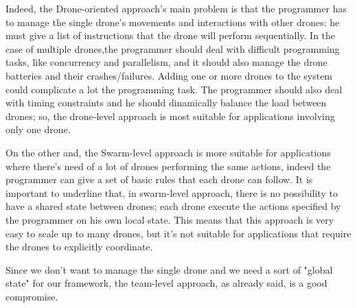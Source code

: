 Indeed, the Drone-oriented approach's main problem is that the programmer has to manage the single drone's movements and interactions with other drones: he must give a list of instructions that the drone will perform sequentially.
In the case of multiple drones,the programmer should deal with difficult programming tasks, like concurrency and parallelism, and it should also manage the drone batteries and their crashes/failures.
Adding one or more drones to the system could complicate a lot the programming task. The programmer should also deal with timing constraints and he should dinamically balance the load between drones; so, the drone-level approach is most suitable for applications involving only one drone.

On the other and, the Swarm-level approach is more suitable for applications where there’s need of a lot of drones performing the same actions, indeed the programmer can give a set of basic rules that each drone can follow. It is important to underline that, in swarm-level approach, there is no possibility to have a shared state between drones; each drone execute the actions specified by the programmer on his own local state. This means that this approach is very easy to scale up to many drones, but it’s not suitable for applications that require the drones to explicitly coordinate.

Since we don't want to manage the single drone and we need a sort of "global state" for our framework, the team-level approach, as already said, is a good compromise.



